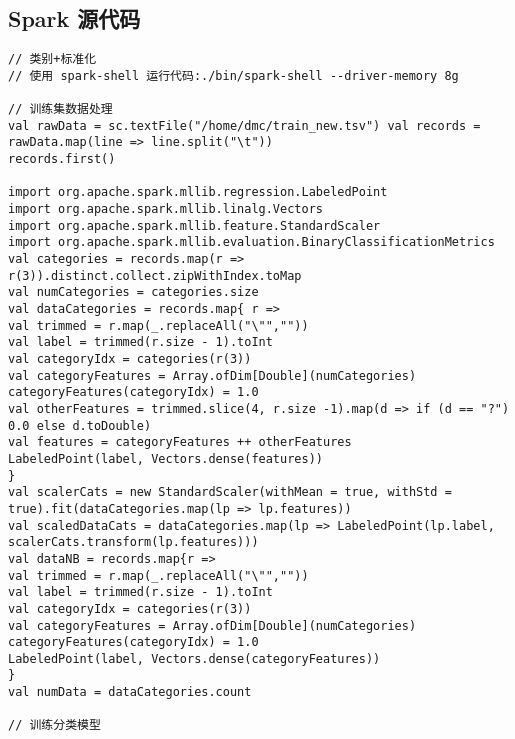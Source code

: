 \subsection{Spark 源代码}\label{spark-ux6e90ux4ee3ux7801}

\begin{lstlisting}
// 类别+标准化
// 使用 spark-shell 运行代码:./bin/spark-shell --driver-memory 8g

// 训练集数据处理
val rawData = sc.textFile("/home/dmc/train_new.tsv") val records = rawData.map(line => line.split("\t"))
records.first()

import org.apache.spark.mllib.regression.LabeledPoint
import org.apache.spark.mllib.linalg.Vectors
import org.apache.spark.mllib.feature.StandardScaler
import org.apache.spark.mllib.evaluation.BinaryClassificationMetrics
val categories = records.map(r => r(3)).distinct.collect.zipWithIndex.toMap 
val numCategories = categories.size
val dataCategories = records.map{ r =>
val trimmed = r.map(_.replaceAll("\"",""))
val label = trimmed(r.size - 1).toInt
val categoryIdx = categories(r(3))
val categoryFeatures = Array.ofDim[Double](numCategories) categoryFeatures(categoryIdx) = 1.0
val otherFeatures = trimmed.slice(4, r.size -1).map(d => if (d == "?") 0.0 else d.toDouble) 
val features = categoryFeatures ++ otherFeatures
LabeledPoint(label, Vectors.dense(features))
}
val scalerCats = new StandardScaler(withMean = true, withStd = true).fit(dataCategories.map(lp => lp.features)) 
val scaledDataCats = dataCategories.map(lp => LabeledPoint(lp.label, scalerCats.transform(lp.features)))
val dataNB = records.map{r =>
val trimmed = r.map(_.replaceAll("\"",""))
val label = trimmed(r.size - 1).toInt
val categoryIdx = categories(r(3))
val categoryFeatures = Array.ofDim[Double](numCategories) categoryFeatures(categoryIdx) = 1.0
LabeledPoint(label, Vectors.dense(categoryFeatures))
}
val numData = dataCategories.count

// 训练分类模型


\end{lstlisting}
